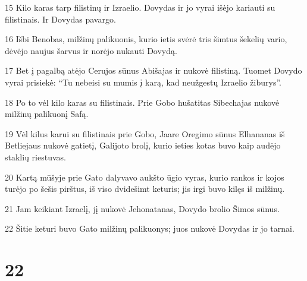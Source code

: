 \par 15 Kilo karas tarp filistinų ir Izraelio. Dovydas ir jo vyrai išėjo kariauti su filistinais. Ir Dovydas pavargo. 
\par 16 Išbi Benobas, milžinų palikuonis, kurio ietis svėrė tris šimtus šekelių vario, dėvėjo naujus šarvus ir norėjo nukauti Dovydą. 
\par 17 Bet į pagalbą atėjo Cerujos sūnus Abišajas ir nukovė filistiną. Tuomet Dovydo vyrai prisiekė: “Tu nebeisi su mumis į karą, kad neužgestų Izraelio žiburys”. 
\par 18 Po to vėl kilo karas su filistinais. Prie Gobo hušatitas Sibechajas nukovė milžinų palikuonį Safą. 
\par 19 Vėl kilus karui su filistinais prie Gobo, Jaare Oregimo sūnus Elhananas iš Betliejaus nukovė gatietį, Galijoto brolį, kurio ieties kotas buvo kaip audėjo staklių riestuvas. 
\par 20 Kartą mūšyje prie Gato dalyvavo aukšto ūgio vyras, kurio rankos ir kojos turėjo po šešis pirštus, iš viso dvidešimt keturis; jis irgi buvo kilęs iš milžinų. 
\par 21 Jam keikiant Izraelį, jį nukovė Jehonatanas, Dovydo brolio Šimos sūnus. 
\par 22 Šitie keturi buvo Gato milžinų palikuonys; juos nukovė Dovydas ir jo tarnai.



\chapter{22}

